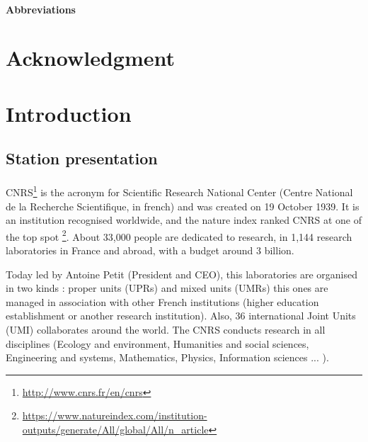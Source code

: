\documentclass{article}
\begin{document}
\paragraph{Abbreviations}





\newpage
\section*{Acknowledgment}



\newpage
{}
\section*{Introduction}

\subsection*{Station presentation}

\paragraph{}
CNRS\footnote{\url{http://www.cnrs.fr/en/cnrs}} is the acronym for Scientific Research National Center (Centre National de la Recherche Scientifique, in french) and was created on 19 October 1939. It is an institution recognised worldwide,  and the nature index ranked CNRS at one of the top spot \footnote{\url{https://www.natureindex.com/institution-outputs/generate/All/global/All/n_article}}. About 33,000 people are dedicated to research, in 1,144 research laboratories in France and abroad, with a budget around 3 billion. 

Today led by Antoine Petit (President and CEO), this laboratories are organised in two kinds : proper units (UPRs) and mixed units (UMRs) this ones are managed in association with other French institutions (higher education establishment or another research institution). Also, 36 international Joint Units (UMI) collaborates around the world. The CNRS conducts research in all disciplines (Ecology and environment, Humanities and social sciences, Engineering and systems, Mathematics, Physics, Information sciences ... ).
\end{document}
